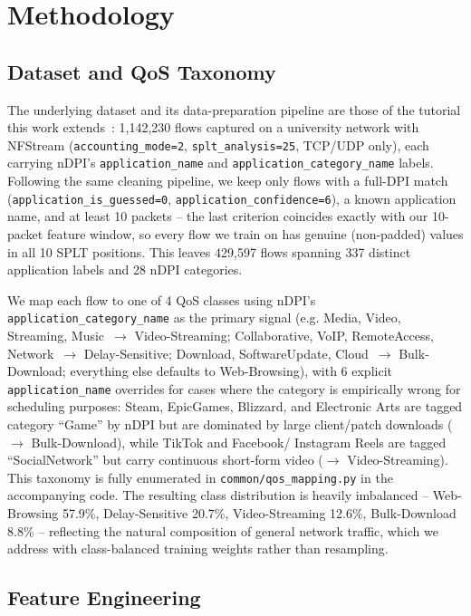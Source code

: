 \documentclass[10pt,twocolumn]{article}
\begin{document}
\section{Methodology}

\subsection{Dataset and QoS Taxonomy}
\label{sec:taxonomy}

The underlying dataset and its data-preparation pipeline are those of the
tutorial this work extends~\cite{pekar2025tutorial}: 1{,}142{,}230 flows
captured on a university network with NFStream
(\texttt{accounting\_mode=2}, \texttt{splt\_analysis=25}, TCP/UDP only),
each carrying nDPI's \texttt{application\_name} and
\texttt{application\_category\_name} labels. Following the same cleaning
pipeline, we keep only flows with a full-DPI match
(\texttt{application\_is\_guessed=0}, \texttt{application\_confidence=6}),
a known application name, and at least 10 packets -- the last criterion
coincides exactly with our 10-packet feature window, so every flow we
train on has genuine (non-padded) values in all 10 SPLT positions. This
leaves 429{,}597 flows spanning 337 distinct application labels and 28
nDPI categories.

We map each flow to one of 4 QoS classes using nDPI's
\texttt{application\_category\_name} as the primary signal (e.g. Media,
Video, Streaming, Music~\(\rightarrow\) Video-Streaming; Collaborative,
VoIP, RemoteAccess, Network~\(\rightarrow\) Delay-Sensitive; Download,
SoftwareUpdate, Cloud~\(\rightarrow\) Bulk-Download; everything else
defaults to Web-Browsing), with 6 explicit \texttt{application\_name}
overrides for cases where the category is empirically wrong for
scheduling purposes: Steam, EpicGames, Blizzard, and Electronic Arts are
tagged category ``Game'' by nDPI but are dominated by large client/patch
downloads (\(\rightarrow\) Bulk-Download), while TikTok and Facebook/
Instagram Reels are tagged ``SocialNetwork'' but carry continuous
short-form video (\(\rightarrow\) Video-Streaming). This taxonomy is
fully enumerated in \texttt{common/qos\_mapping.py} in the accompanying
code. The resulting class distribution is heavily imbalanced --
Web-Browsing 57.9\%, Delay-Sensitive 20.7\%, Video-Streaming 12.6\%,
Bulk-Download 8.8\% -- reflecting the natural composition of general
network traffic, which we address with class-balanced training weights
rather than resampling.

\subsection{Feature Engineering}
\end{document}

